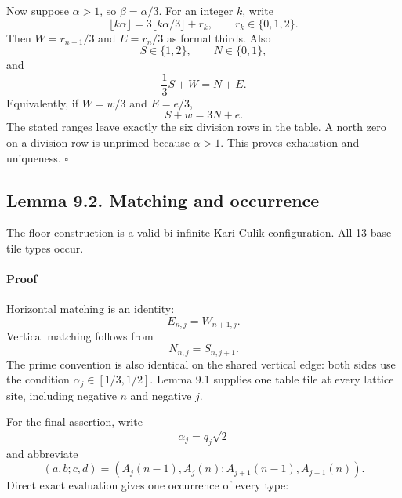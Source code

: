 \documentclass[11pt]{article}
\begin{document}
Now suppose \(\alpha>1\), so \(\beta=\alpha/3\). For an integer \(k\), write
\[
  \lfloor k\alpha\rfloor=3\lfloor k\alpha/3\rfloor+r_k,
  \qquad r_k\in\{0,1,2\}.
\]
Then \(W=r_{n-1}/3\) and \(E=r_n/3\) as formal thirds. Also
\[
  S\in\{1,2\},\qquad N\in\{0,1\},
\]
and
\[
  \frac13S+W=N+E.
\]
Equivalently, if \(W=w/3\) and \(E=e/3\),
\[
  S+w=3N+e.
\]
The stated ranges leave exactly the six division rows in the table. A north
zero on a division row is unprimed because \(\alpha>1\). This proves
exhaustion and uniqueness. \(\square\)

\subsection*{Lemma 9.2. Matching and occurrence}

The floor construction is a valid bi-infinite Kari-Culik configuration. All
13 base tile types occur.

\paragraph{Proof}

Horizontal matching is an identity:
\[
  E_{n,j}=W_{n+1,j}.
\]
Vertical matching follows from
\[
  N_{n,j}=S_{n,j+1}.
\]
The prime convention is also identical on the shared vertical edge: both
sides use the condition
\(\alpha_j\in[1/3,1/2]\). Lemma 9.1 supplies one table tile at every lattice
site, including negative \(n\) and negative \(j\).

For the final assertion, write
\[
  \alpha_j=q_j\sqrt2
\]
and abbreviate
\[
  (a,b;c,d)=
  (A_j(n-1),A_j(n);A_{j+1}(n-1),A_{j+1}(n)).
\]
Direct exact evaluation gives one occurrence of every type:
\end{document}
